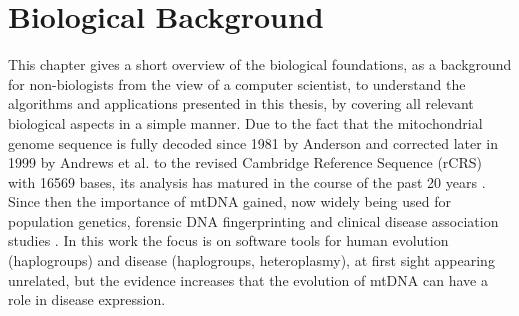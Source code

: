 \chapter{Biological Background} 
\label{chap:BioFound}
This chapter gives a short overview of the biological foundations, as a background for non-biologists from the view of a computer scientist, to understand the algorithms and applications presented in this thesis, by covering all relevant biological aspects in a simple manner. Due to the fact that the mitochondrial genome sequence is fully decoded since 1981 by Anderson \cite{Anderson1981} and corrected later in 1999 by Andrews et al. \cite{Andrews1999} to the revised Cambridge Reference Sequence (rCRS) with 16569 bases, its analysis has matured in the course of the past 20 years \cite{BandeltHansJurgenRichardsMartinMacaulay2006}. Since then the importance of mtDNA gained, now widely being used for population genetics, forensic DNA fingerprinting and clinical disease association studies \cite{Weissensteiner2010}. In this work the focus is on software tools for human evolution (haplogroups) and disease (haplogroups, heteroplasmy), at first sight appearing unrelated, but the evidence increases that the evolution of mtDNA can have a role in disease expression\cite{BandeltHansJurgenRichardsMartinMacaulay2006}. 

